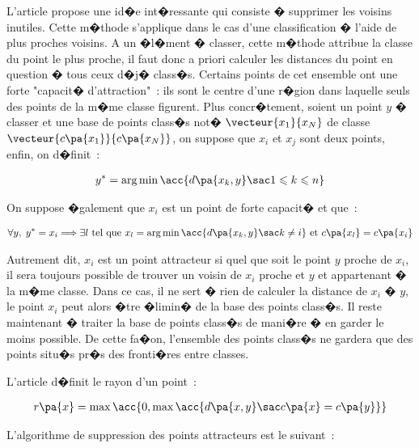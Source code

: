L'article  propose une id�e int�ressante qui consiste � supprimer les voisins inutiles. Cette m�thode s'applique dans le cas d'une classification � l'aide de plus proches voisins. A un �l�ment � classer, cette m�thode attribue la classe du point le plus proche, il faut donc a priori calculer les distances du point en question � tous ceux d�j� class�s. Certains points de cet ensemble ont une forte "capacit� d'attraction"~: ils sont le centre d'une r�gion dans laquelle seuls des points de la m�me classe figurent. Plus concr�tement, soient un point $y$ � classer et une base de points class�s not� $\vecteur{x_1}{x_N}$ de classe $\vecteur{c\pa{x_1}}{c\pa{x_N}}$, on suppose que $x_i$ et $x_j$ sont deux points, enfin, on d�finit~:

        \begin{eqnarray}
        y^*                     = \arg \min \acc{ d\pa{x_k, y} \sac 1 \leqslant k \leqslant n }
        \end{eqnarray}

On suppose �galement que $x_i$ est un point de forte capacit� et que~:

        \begin{eqnarray}
        \forall y, \; y^* = x_i \Longrightarrow \exists l \text{ tel que } 
                                        x_l = \arg \min \acc{ d\pa{x_k, y} \sac k \neq i } \text{ et } c\pa{x_l} = c\pa{x_i}
        \end{eqnarray}

Autrement dit, $x_i$ est un point attracteur si quel que soit le point $y$ proche de $x_i$, il sera toujours possible de trouver un voisin de $x_i$ proche et $y$ et appartenant � la m�me classe. Dans ce cas, il ne sert � rien de calculer la distance de $x_i$ � $y$, le point $x_i$ peut alors �tre �limin� de la base des points class�s. Il reste maintenant � traiter la base de points class�s de mani�re � en garder le moins possible. De cette fa�on, l'ensemble des points class�s ne gardera que des points situ�s pr�s des fronti�res entre classes.

L'article  d�finit le rayon d'un point~:

        \begin{eqnarray}
        r\pa{x}  = \max\acc { 0, \max \acc{ d\pa{x, y} \sac c\pa{x} = c\pa{y} } }
        \end{eqnarray}
        
L'algorithme de suppression des points attracteurs est le suivant~:

